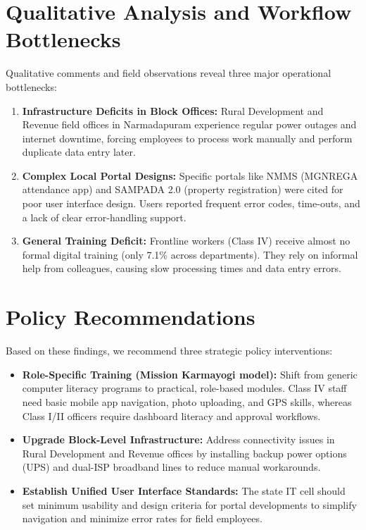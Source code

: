 \documentclass[10pt,a4paper]{article}
\begin{document}
\section{Qualitative Analysis and Workflow Bottlenecks}
Qualitative comments and field observations reveal three major operational bottlenecks:
\begin{enumerate}
  \item \textbf{Infrastructure Deficits in Block Offices:} Rural Development and Revenue field offices in Narmadapuram experience regular power outages and internet downtime, forcing employees to process work manually and perform duplicate data entry later.
  \item \textbf{Complex Local Portal Designs:} Specific portals like NMMS (MGNREGA attendance app) and SAMPADA 2.0 (property registration) were cited for poor user interface design. Users reported frequent error codes, time-outs, and a lack of clear error-handling support.
  \item \textbf{General Training Deficit:} Frontline workers (Class IV) receive almost no formal digital training (only 7.1\% across departments). They rely on informal help from colleagues, causing slow processing times and data entry errors.
\end{enumerate}

\section{Policy Recommendations}
Based on these findings, we recommend three strategic policy interventions:
\begin{itemize}
  \item \textbf{Role-Specific Training (Mission Karmayogi model):} Shift from generic computer literacy programs to practical, role-based modules. Class IV staff need basic mobile app navigation, photo uploading, and GPS skills, whereas Class I/II officers require dashboard literacy and approval workflows.
  \item \textbf{Upgrade Block-Level Infrastructure:} Address connectivity issues in Rural Development and Revenue offices by installing backup power options (UPS) and dual-ISP broadband lines to reduce manual workarounds.
  \item \textbf{Establish Unified User Interface Standards:} The state IT cell should set minimum usability and design criteria for portal developments to simplify navigation and minimize error rates for field employees.
\end{itemize}
\end{document}
